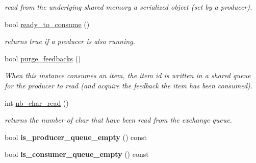 \begin{DoxyCompactItemize}
\begin{DoxyCompactList}\small\item\em read from the underlying shared memory a serialized object (set by a producer). \end{DoxyCompactList}\item 
bool \hyperlink{classshared__memory_1_1Exchange__manager__consumer_af1a894d796387d297f848d18d8d55df5}{ready\+\_\+to\+\_\+consume} ()
\begin{DoxyCompactList}\small\item\em returns true if a producer is also running. \end{DoxyCompactList}\item 
bool \hyperlink{classshared__memory_1_1Exchange__manager__consumer_a5e62220c9b50327130cb95683d22b0dc}{purge\+\_\+feedbacks} ()
\begin{DoxyCompactList}\small\item\em When this instance consumes an item, the item id is written in a shared queue for the producer to read (and acquire the feedback the item has been consumed). \end{DoxyCompactList}\item 
int \hyperlink{classshared__memory_1_1Exchange__manager__consumer_ab8651cff750b5cb2ceae97a97b2c7f2d}{nb\+\_\+char\+\_\+read} ()
\begin{DoxyCompactList}\small\item\em returns the number of char that have been read from the exchange queue. \end{DoxyCompactList}\item 
bool {\bfseries is\+\_\+producer\+\_\+queue\+\_\+empty} () const \hypertarget{classshared__memory_1_1Exchange__manager__consumer_ad7d4cd68db87b53a0fe45f08c4adb647}{}\label{classshared__memory_1_1Exchange__manager__consumer_ad7d4cd68db87b53a0fe45f08c4adb647}

\item 
bool {\bfseries is\+\_\+consumer\+\_\+queue\+\_\+empty} () const \hypertarget{classshared__memory_1_1Exchange__manager__consumer_a5d50ce37fd9464f45b973f6e96b81ba3}{}\label{classshared__memory_1_1Exchange__manager__consumer_a5d50ce37fd9464f45b973f6e96b81ba3}

\end{DoxyCompactItemize}
